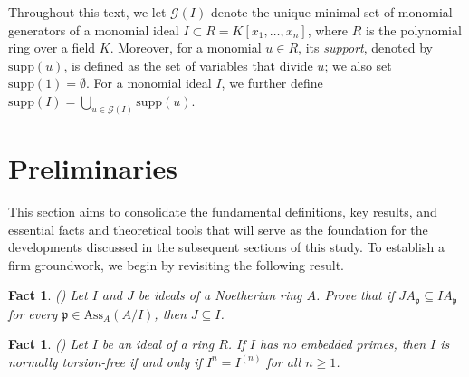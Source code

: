 \documentclass[11pt]{amsart}
\newtheorem{fact}[theorem]{Fact}
\begin{document}
  
 Throughout this text, we let $\mathcal{G}(I)$ denote the unique minimal set of monomial generators of a monomial ideal $I \subset R = K[x_1, \ldots, x_n]$, where $R$ is the polynomial ring over a field $K$. Moreover, for a monomial $u \in R$, its {\em support}, denoted by $\mathrm{supp}(u)$, is defined as the set of variables that divide $u$;  we also set $\mathrm{supp}(1) = \emptyset$. For a monomial ideal $I$, we further define  
$\mathrm{supp}(I) = \bigcup_{u \in \mathcal{G}(I)} \mathrm{supp}(u).$
  

 

\section{Preliminaries} \label{Section 2}

This section aims to consolidate the fundamental definitions, key results, and essential facts and theoretical tools that will serve as the foundation for the developments discussed in the subsequent sections of this study. To establish a firm groundwork, we begin by revisiting the following result.



\begin{fact} \label{Exercise 6.4} (\cite[Exercise 6.4]{MAT})
Let $I$  and  $J$ be ideals of a Noetherian ring $A$. Prove that if $JA_\mathfrak{p} \subseteq  IA_\mathfrak{p}$  for
every $\mathfrak{p}\in \mathrm{Ass}_A(A/I)$,  then $J\subseteq I$. 
\end{fact}


\begin{fact} \label{proposition 4.3.29} (\cite[Proposition 4.3.29]{V1})
 Let $I$ be an ideal of a ring $R$. If $I$ has no embedded
primes, then $I$ is normally torsion-free if and only if $I^n = I^{(n)}$ for all $n \geq 1$. 
\end{fact}

\end{document}
